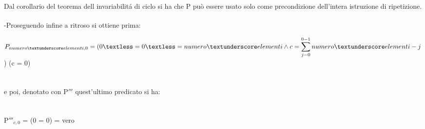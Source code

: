 \documentclass[11pt, a4paper, titlepage, block]{article}
\begin{document}
Dal corollario del teorema dell invariabilit\'a di ciclo si ha che P può essere usato solo come precondizione dell'intera istruzione di ripetizione.
\\
\\
-Proseguendo infine a ritroso si ottiene prima:

 $P_{numero\textunderscore elementi,0} = (0 \textless= 0 \textless= numero\textunderscore elementi \wedge c = \displaystyle \sum_{j=0}^{0-1} numero\textunderscore elementi - j$) (c = 0)
 \\
 \\
 \\
 e poi, denotato  con P$'''$ quest'ultimo predicato si ha:
 \\
 \\
 \\
 P$'''$$_{c,0}$ = (0 = 0) = vero
\end{document}
